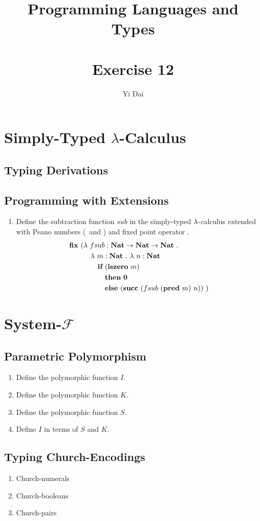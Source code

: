 \documentclass[a4paper,12pt]{article}
\title{
 Programming Languages and Types \\~\\
 \textbf{Exercise 12}
}
\author{
 Yi Dai
}
\begin{document}
\maketitle

\section{Simply-Typed $\lambda$-Calculus}

\subsection{Typing Derivations}

\subsection{Programming with Extensions}

\begin{enumerate}
 \item Define the subtraction function $sub$ in the simply-typed $\lambda$-calculus extended with Peano numbers
  (\zero\ and \succ) and fixed point operator \fixp.
  \begin{align*}
   \fixp\ (& \lamb\ fsub : \NatT \rarr \NatT \rarr \NatT\ . \\
           & \quad \lamb\ m : \NatT\ .\ \lamb\ n : \NatT \\
           & \quad \quad \ifkw\ (\isze\ m) \\
           & \quad \quad \quad \thkw\ \zero \\
           & \quad \quad \quad \elkw\ (\succ\ (fsub\ (\pred\ m)\ n))\ )
  \end{align*}
\end{enumerate}

\section{System-$\mathcal{F}$}

\subsection{Parametric Polymorphism}

\begin{enumerate}
 \item Define the polymorphic function $I$.
 \item Define the polymorphic function $K$.
 \item Define the polymorphic function $S$.
 \item Define $I$ in terms of $S$ and $K$.
\end{enumerate}

\subsection{Typing Church-Encodings}

\begin{enumerate}
 \item Church-numerals
 \item Church-booleans
 \item Church-pairs
\end{enumerate}
\end{document}
